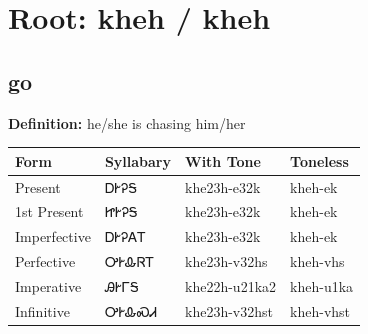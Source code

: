 \documentclass{article}%
\begin{document}
%
\normalsize%
\section*{Root: kheh / kheh}%
\subsection*{go}%
\textbf{Definition: }%
he/she is chasing him/her%
\\[0.5em]%
\begin{tabular}{|l|l|l|l|}%
\hline%
\textbf{Form}&\textbf{Syllabary}&\textbf{With Tone}&\textbf{Toneless}\\%
\hline%
Present&ᎠᎨᎮᎦ&khe23h{-}e32k&kheh{-}ek\\%
1st Present&ᏥᎨᎮᎦ&khe23h{-}e32k&kheh{-}ek\\%
Imperfective&ᎠᎨᎮᎪᎢ&khe23h{-}e32k&kheh{-}ek\\%
Perfective&ᎤᎨᎲᏒᎢ&khe23h{-}v32hs&kheh{-}vhs\\%
Imperative&ᎯᎨᎱᎦ&khe22h{-}u21ka2&kheh{-}u1ka\\%
Infinitive&ᎤᎨᎲᏍᏗ&khe23h{-}v32hst&kheh{-}vhst\\%
\hline%
\end{tabular}%
\\[1em]%
\end{document}
